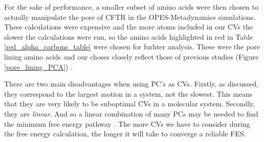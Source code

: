 For the sake of performance, a smaller subset of amino acids were then chosen to actually manipulate the pore of CFTR in the OPES-Metadynamics simulations. These calculations were expensive and the more atoms included in our CVs the slower the calculations were run, so the amino acids highlighted in red in Table \ref{red_alpha_carbons_table} were chosen for furhter analysis. These were the pore lining amino acids and our choses closely reflect those of previous studies (Figure \ref{pore_lining_PCA}) \cite{hoffmann2018}. 

There are two main disadvantages when using PC's as CVs. Firstly, as discussed, they correspond to the largest motion in a system, not the slowest. This means that they are very likely to be suboptimal CVs in a molecular system. Secondly, they are \textit{linear}. And so a linear combination of many PCs  may be needed to find the minimum free energy pathway \cite{}. The more CVs we have to consider during the free energy calculation, the longer it will take to converge a reliable FES.

